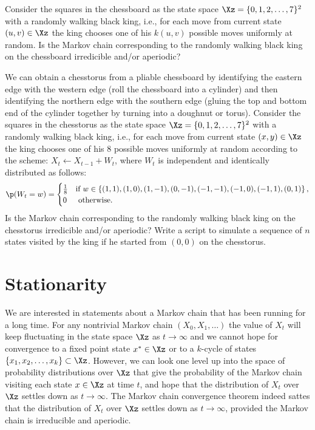 \begin{exercise}\label{EXR:KingRWChessBoard}
Consider the squares in the chessboard as the state space $\Xz = \{ 0,1,2,\ldots,7\}^2$ with a randomly walking black king, i.e., for each move from current state $(u,v) \in \Xz$ the king chooses one of his $k(u,v)$ possible moves uniformly at random.  
Is the Markov chain corresponding to the randomly walking black king on the chessboard irredicible and/or aperiodic?  
\end{exercise}

\begin{exercise}\label{EXR:KingRWChessTorus}
We can obtain a chesstorus from a pliable chessboard by identifying the eastern edge with the western edge (roll the chessboard into a cylinder) and then identifying the northern edge with the southern edge (gluing the top and bottom end of the cylinder together by turning into a doughnut or torus).  Consider the squares in the chesstorus as the state space $\Xz = \{ 0,1,2,\ldots,7\}^2$ with a randomly walking black king, i.e., for each move from current state $(x,y) \in \Xz$ the king chooses one of his $8$ possible moves uniformly at random according to the scheme: $X_t \gets X_{t-1}+ W_t$, where $W_t$ is independent and identically distributed as follows:
\[ 
\p(W_t = w) = 
\begin{cases}
\frac{1}{8} & \text{if } w \in \left\{ (1,1), (1,0), (1,-1), (0,-1), (-1,-1), (-1,0), (-1,1), (0,1) \right\} , \\
0 & \text{ otherwise}.
\end{cases}
\]
Is the Markov chain corresponding to the randomly walking black king on the chesstorus irredicible and/or aperiodic?  Write a \Matlab script to simulate a sequence of $n$ states visited by the king if he started from $(0,0)$ on the chesstorus.
\end{exercise}

\section{Stationarity}\label{S:Stationarity}

We are interested in statements about a Markov chain that has been running for a long time.  
For any nontrivial Markov chain $(X_0,X_1,\ldots)$ the value of $X_t$ will keep fluctuating in the state space $\Xz$ as $t \to \infty$ and we cannot hope for convergence to a fixed point state $x^* \in \Xz$ or to a $k$-cycle of states $\{x_1,x_2,\ldots,x_k\} \subset \Xz$.  However, we can look one level up into the space of probability distributions over $\Xz$ that give the probability of the Markov chain visiting each state $x \in \Xz$ at time $t$, and hope that the distribution of $X_t$ over $\Xz$ settles down as $t \to \infty$.  The Markov chain convergence theorem indeed sattes that the distribution of $X_t$ over $\Xz$ settles down as $t \to \infty$, provided the Markov chain is irreducible and aperiodic.

